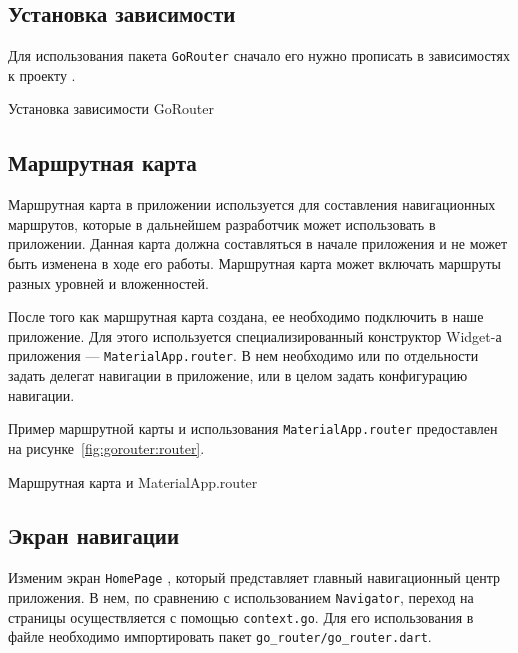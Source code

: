 \subsection{Установка зависимости}

Для использования пакета \texttt{GoRouter} сначало его нужно
прописать в зависимостях к проекту .

\begin{image}
	\caption{Установка зависимости GoRouter}
	\label{fig:gorouter:dep}
\end{image}

\subsection{Маршрутная карта}

Маршрутная карта в приложении используется
для составления навигационных маршрутов,
которые в дальнейшем разработчик может использовать в приложении.
Данная карта должна составляться в начале приложения
и не может быть изменена в ходе его работы.
Маршрутная карта может включать маршруты разных уровней и вложенностей.\par
После того как маршрутная карта создана,
ее необходимо подключить в наше приложение.
Для этого используется специализированный конструктор
Widget-а приложения --- \texttt{MaterialApp.router}.
В нем необходимо или по отдельности задать делегат навигации в приложение,
или в целом задать конфигурацию навигации.

Пример маршрутной карты и использования \texttt{MaterialApp.router}
предоставлен на рисунке~\ref{fig:gorouter:router}.

\begin{image}
	\caption{Маршрутная карта и MaterialApp.router}
	\label{fig:gorouter:router}
\end{image}

\subsection{Экран навигации}

Изменим экран \texttt{HomePage} ,
который представляет главный навигационный центр приложения.
В нем, по сравнению с использованием \texttt{Navigator},
переход на страницы осуществляется с помощью \texttt{context.go}.
Для его использования в файле необходимо импортировать
пакет \verb|go_router/go_router.dart|.

